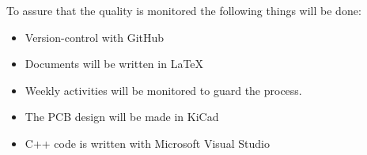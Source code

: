 To assure that the quality is monitored the following things will be done:
\begin{itemize}
    \item Version-control with GitHub
    \item Documents will be written in LaTeX
    \item Weekly activities will be monitored to guard the process.
    \item The PCB design will be made in KiCad
    \item C++ code is written with Microsoft Visual Studio
\end{itemize}